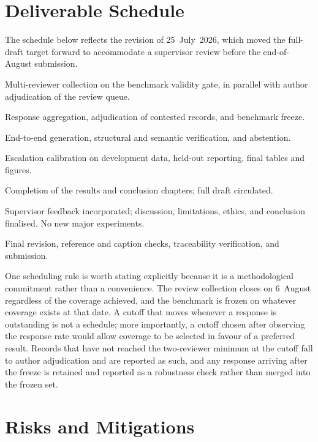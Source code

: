 \section{Deliverable Schedule}
\label{sec:context-schedule}

The schedule below reflects the revision of 25~July~2026, which moved the full-draft target forward to accommodate a supervisor review before the end-of-August submission.

\begin{description}[style=multiline,leftmargin=3.9cm,labelwidth=3.3cm]
  \item[25 July -- 6 August] Multi-reviewer collection on the benchmark validity gate, in parallel with author adjudication of the review queue.
  \item[6 -- 7 August] Response aggregation, adjudication of contested records, and benchmark freeze.
  \item[7 -- 10 August] End-to-end generation, structural and semantic verification, and abstention.
  \item[10 -- 11 August] Escalation calibration on development data, held-out reporting, final tables and figures.
  \item[11 -- 12 August] Completion of the results and conclusion chapters; full draft circulated.
  \item[13 -- 25 August] Supervisor feedback incorporated; discussion, limitations, ethics, and conclusion finalised. No new major experiments.
  \item[26 -- 31 August] Final revision, reference and caption checks, traceability verification, and submission.
\end{description}

One scheduling rule is worth stating explicitly because it is a methodological commitment rather than a convenience. The review collection closes on 6~August regardless of the coverage achieved, and the benchmark is frozen on whatever coverage exists at that date. A cutoff that moves whenever a response is outstanding is not a schedule; more importantly, a cutoff chosen after observing the response rate would allow coverage to be selected in favour of a preferred result. Records that have not reached the two-reviewer minimum at the cutoff fall to author adjudication and are reported as such, and any response arriving after the freeze is retained and reported as a robustness check rather than merged into the frozen set.

\section{Risks and Mitigations}
\label{sec:context-risks}

